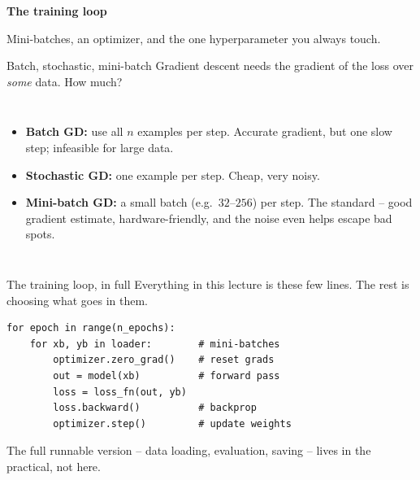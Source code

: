\documentclass[aspectratio=169]{beamer}
\begin{document}
\begin{frame}[plain]
  \vfill
  \begin{center}
    {\Large\color{popblue}\textbf{The training loop}}\\[0.9em]
    \begin{minipage}{0.82\textwidth}\centering\small
      Mini-batches, an optimizer, and the one hyperparameter you always touch.
    \end{minipage}
  \end{center}
  \vfill
\end{frame}

\begin{frame}{Batch, stochastic, mini-batch}
  Gradient descent needs the gradient of the loss over \emph{some} data. How much?
  \vfill
  \begin{columns}[T]
    \begin{itemize}\small
      \item \textbf{Batch GD:} use all $n$ examples per step. Accurate gradient, but one slow
        step; infeasible for large data.
      \item \textbf{Stochastic GD:} one example per step. Cheap, very noisy.
      \item \textbf{Mini-batch GD:} a small batch (e.g.\ $32$--$256$) per step. The standard --
        good gradient estimate, hardware-friendly, and the noise even helps escape bad spots.
    \end{itemize}
  \end{columns}
\end{frame}

\begin{frame}[fragile]{The training loop, in full}
  Everything in this lecture is these few lines. The rest is choosing what goes in them.
  \vfill
{\lstset{basicstyle=\ttfamily\small}
\begin{lstlisting}
for epoch in range(n_epochs):
    for xb, yb in loader:        # mini-batches
        optimizer.zero_grad()    # reset grads
        out = model(xb)          # forward pass
        loss = loss_fn(out, yb)
        loss.backward()          # backprop
        optimizer.step()         # update weights
\end{lstlisting}}
  \vfill
  \footnotesize The full runnable version -- data loading, evaluation, saving -- lives in the
  practical, not here.
\end{frame}
\end{document}
